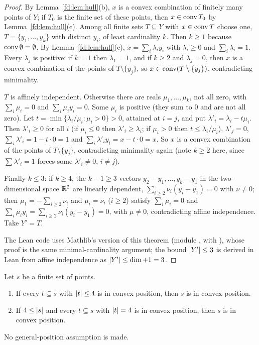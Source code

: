 \begin{proof}
By Lemma~\ref{fd:lem:hull}(b), $x$ is a convex combination of finitely many points of $Y$; if $T_0$ is the
finite set of these points, then $x\in\operatorname{conv} T_0$ by Lemma~\ref{fd:lem:hull}(c). Among all finite sets
$T\subseteq Y$ with $x\in\operatorname{conv} T$ choose one, $T=\{y_1,\dots,y_k\}$ with distinct $y_i$, of least
cardinality $k$. Then $k\ge1$ because $\operatorname{conv}\emptyset=\emptyset$. By Lemma~\ref{fd:lem:hull}(c),
$x=\sum_i\lambda_iy_i$ with $\lambda_i\ge0$ and $\sum_i\lambda_i=1$. Every $\lambda_j$ is positive: if
$k=1$ then $\lambda_1=1$, and if $k\ge2$ and $\lambda_j=0$, then $x$ is a convex combination of the points
of $T\setminus\{y_j\}$, so $x\in\operatorname{conv}(T\setminus\{y_j\})$, contradicting minimality.

$T$ is affinely independent. Otherwise there are reals $\mu_1,\dots,\mu_k$, not all zero, with
$\sum_i\mu_i=0$ and $\sum_i\mu_iy_i=0$. Some $\mu_i$ is positive (they sum to $0$ and are not all zero).
Let $t=\min\{\lambda_i/\mu_i:\mu_i>0\}>0$, attained at $i=j$, and put $\lambda'_i=\lambda_i-t\mu_i$. Then
$\lambda'_i\ge0$ for all $i$ (if $\mu_i\le0$ then $\lambda'_i\ge\lambda_i$; if $\mu_i>0$ then
$t\le\lambda_i/\mu_i$), $\lambda'_j=0$, $\sum_i\lambda'_i=1-t\cdot0=1$ and
$\sum_i\lambda'_iy_i=x-t\cdot0=x$. So $x$ is a convex combination of the points of $T\setminus\{y_j\}$,
contradicting minimality again (note $k\ge2$ here, since $\sum\lambda'_i=1$ forces some
$\lambda'_i\ne0$, $i\ne j$).

Finally $k\le3$: if $k\ge4$, the $k-1\ge3$ vectors $y_2-y_1,\dots,y_k-y_1$ in the two-dimensional space
$\mathbb R^2$ are linearly dependent, $\sum_{i\ge2}\nu_i(y_i-y_1)=0$ with $\nu\ne0$; then $\mu_1=-\sum_{i\ge2}\nu_i$
and $\mu_i=\nu_i$ ($i\ge2$) satisfy $\sum_i\mu_i=0$ and $\sum_i\mu_iy_i=\sum_{i\ge2}\nu_i(y_i-y_1)=0$, with
$\mu\ne0$, contradicting affine independence. Take $Y'=T$.

The Lean code uses Mathlib's version of this theorem (module ,
with ), whose proof is the same minimal-cardinality
argument; the bound $\lvert Y'\rvert\le3$ is derived in Lean from affine independence as
$\lvert Y'\rvert\le\dim+1=3$.
\end{proof}

\begin{lemma}\label{fd:lem:four-subsets}\raggedright
Let $s$ be a finite set of points.
\begin{enumerate}[label=(\alph*)]
\item If every $t\subseteq s$ with $\lvert t\rvert\le4$ is in convex position, then $s$ is in convex position.
\item If $4\le\lvert s\rvert$ and every $t\subseteq s$ with $\lvert t\rvert=4$ is in convex position, then $s$ is in
  convex position.
\end{enumerate}
No general-position assumption is made.
\end{lemma}

